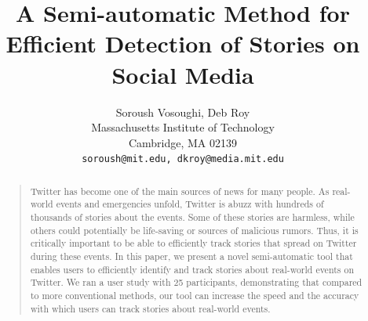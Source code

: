 \documentclass[letterpaper]{article}
\begin{document}
%
\title{A Semi-automatic Method for Efficient Detection of Stories on Social Media}

\author{Soroush Vosoughi, Deb Roy\\
Massachusetts Institute of Technology\\ Cambridge, MA 02139\\ \tt{soroush@mit.edu, dkroy@media.mit.edu}}




\maketitle
\begin{abstract}
\begin{quote}
Twitter has become one of the main sources of news for many people. As real-world events and emergencies unfold, Twitter is abuzz with hundreds of thousands of stories about the events. Some of these stories are harmless, while others could potentially be life-saving or sources of malicious rumors. Thus, it is critically important to be able to efficiently track stories that spread on Twitter during these events. In this paper, we present a novel semi-automatic tool that enables users to efficiently identify and track stories about real-world events on Twitter. We ran a user study with 25 participants, demonstrating that compared to more conventional methods, our tool can increase the speed and the accuracy with which users can track stories about real-world events.
\end{quote}
\end{abstract}
\end{document}
